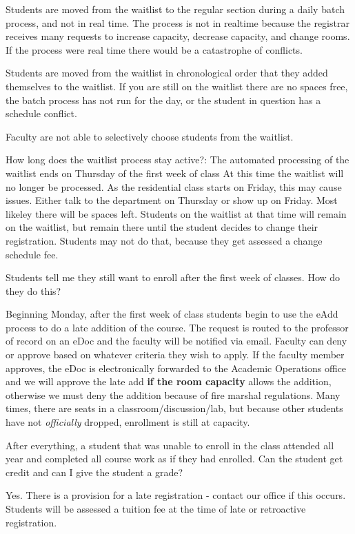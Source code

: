 \begin{itemize}
Students are moved from the waitlist to the regular section during a
daily batch process, and not in real time. The process is not in
realtime because the registrar receives many requests to increase
capacity, decrease capacity, and change rooms. If the process were real
time there would be a catastrophe of conflicts.

Students are moved from the waitlist in chronological order that they
added themselves to the waitlist. If you are still on the waitlist there
are no spaces free, the batch process has not run for the day, or the
student in question has a schedule conflict.

Faculty are not able to selectively choose students from the waitlist.

How long does the waitlist process stay active?: The automated
processing of the waitlist ends on Thursday of the first week of class
At this time the waitlist will no longer be processed. 
As the residential class starts on Friday, this may cause
issues. Either talk to the department on Thursday or show up on
Friday. Most likeley there will be spaces left. 
Students on the waitlist at that time will remain on the waitlist, but remain there
until the student decides to change their registration. Students may not
do that, because they get assessed a change schedule fee.

Students tell me they still want to enroll after the first week of
classes. How do they do this?

Beginning Monday, after the first week of class students begin to use
the eAdd process to do a late addition of the course. The request is
routed to the professor of record on an eDoc and the faculty will be
notified via email. Faculty can deny or approve based on whatever
criteria they wish to apply. If the faculty member approves, the eDoc
is electronically forwarded to the Academic Operations office and we
will approve the late add \textbf{if the room capacity} allows the
addition, otherwise we must deny the addition because of fire marshal
regulations. Many times, there are seats in a
classroom/discussion/lab, but because other students have not
\emph{officially} dropped, enrollment is still at capacity.

After everything, a student that was unable to enroll in the class
attended all year and completed all course work as if they had enrolled.
Can the student get credit and can I give the student a grade?

Yes. There is a provision for a late registration - contact our office
if this occurs. Students will be assessed a tuition fee at the time of
late or retroactive registration.


\end{itemize}
